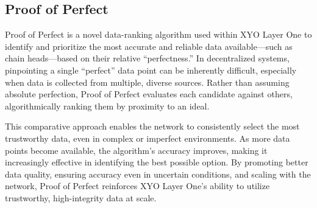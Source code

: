\documentclass{article}
\begin{document}
\subsection{Proof of Perfect}
Proof of Perfect is a novel data-ranking algorithm used within XYO Layer One to
identify and prioritize the most accurate and reliable data available—such as
chain heads—based on their relative “perfectness.” In decentralized systems,
pinpointing a single “perfect” data point can be inherently difficult,
especially when data is collected from multiple, diverse sources. Rather than
assuming absolute perfection, Proof of Perfect evaluates each candidate against
others, algorithmically ranking them by proximity to an ideal.

This comparative approach enables the network to consistently select the most
trustworthy data, even in complex or imperfect environments. As more data
points become available, the algorithm's accuracy improves, making it
increasingly effective in identifying the best possible option. By promoting
better data quality, ensuring accuracy even in uncertain conditions, and
scaling with the network, Proof of Perfect reinforces XYO Layer One's ability
to utilize trustworthy, high-integrity data at scale.
\end{document}
